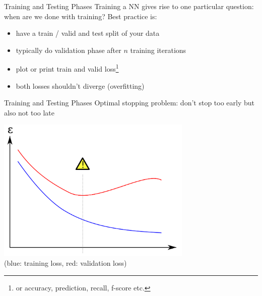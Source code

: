 \documentclass{beamer}
\begin{document}
\begin{frame}{Training and Testing Phases}
Training a NN gives rise to one particular question: when are we done with training? Best practice is: 
\begin{itemize}
\item have a train / valid and test split of your data
\item typically do validation phase after $n$ training iterations
\item plot or print train and valid loss\footnote{or accuracy, prediction, recall, f-score etc.}
\item both losses shouldn't diverge (overfitting)
\end{itemize}
\end{frame}

\begin{frame}{Training and Testing Phases}
Optimal stopping problem: don't stop too early but also not too late 
\begin{center}
\includegraphics[width=0.7\textwidth]{overfitting_nn}\\
(blue: training loss, red: validation loss)
\cite{WikiOverfitting}
\end{center}
\end{frame}
\end{document}
